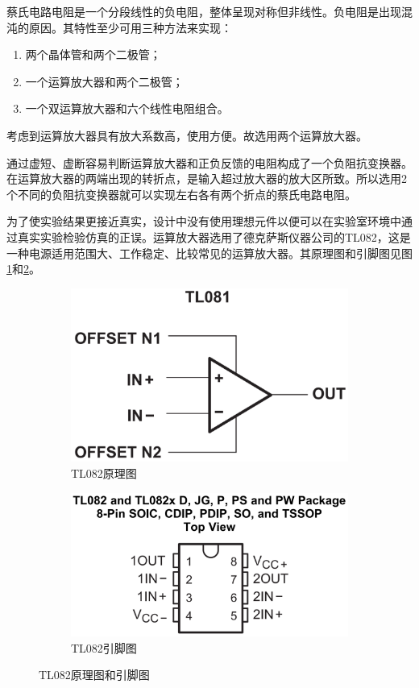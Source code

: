 \documentclass{article}
\begin{document}
蔡氏电路电阻是一个分段线性的负电阻，整体呈现对称但非线性。负电阻是出现混沌的原因。其特性至少可用三种方法来实现：

\begin{enumerate}
	\item 两个晶体管和两个二极管；
	\item 一个运算放大器和两个二极管；
	\item 一个双运算放大器和六个线性电阻组合。
\end{enumerate}

考虑到运算放大器具有放大系数高，使用方便。故选用两个运算放大器。

通过虚短、虚断容易判断运算放大器和正负反馈的电阻构成了一个负阻抗变换器。在运算放大器的两端出现的转折点，是输入超过放大器的放大区所致。所以选用2个不同的负阻抗变换器就可以实现左右各有两个折点的蔡氏电路电阻。

为了使实验结果更接近真实，设计中没有使用理想元件以便可以在实验室环境中通过真实实验检验仿真的正误。运算放大器选用了德克萨斯仪器公司的TL082，这是一种电源适用范围大、工作稳定、比较常见的运算放大器。其原理图和引脚图见图\ref{fig:TL082原理图}和\ref{fig:TL082引脚图}。

\begin{figure}[htpb]
	\centering
	\begin{subfigure}[htpb]{.45\linewidth}
		\centering
		\includegraphics[width=.9\linewidth]{TL082scheme.png}
		\caption{TL082原理图}
		\label{fig:TL082原理图}
	\end{subfigure}
	\quad
	\begin{subfigure}[htpb]{.45\linewidth}
		\centering
		\includegraphics[width=.9\linewidth]{TL082pin.png}
		\caption{TL082引脚图}
		\label{fig:TL082引脚图}
	\end{subfigure}
	\caption{TL082原理图和引脚图}
	\label{fig:TL082原理图和引脚图}
\end{figure}
\end{document}
